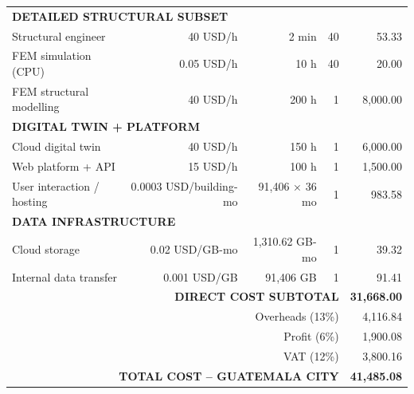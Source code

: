 \begin{longtable}{lrrrr}
\multicolumn{5}{l}{\textbf{DETAILED STRUCTURAL SUBSET}} \\

Structural engineer & 40 USD/h & 2 min & 40 & 53.33 \\
FEM simulation (CPU) & 0.05 USD/h & 10 h & 40 & 20.00 \\
FEM structural modelling & 40 USD/h & 200 h & 1 & 8,000.00 \\
\hline

\multicolumn{5}{l}{\textbf{DIGITAL TWIN + PLATFORM}} \\

Cloud digital twin & 40 USD/h & 150 h & 1 & 6,000.00 \\
Web platform + API & 15 USD/h & 100 h & 1 & 1,500.00 \\
User interaction / hosting & 0.0003 USD/building-mo & 91,406 × 36 mo & 1 & 983.58 \\
\hline

\multicolumn{5}{l}{\textbf{DATA INFRASTRUCTURE}} \\

Cloud storage & 0.02 USD/GB-mo & 1,310.62 GB-mo & 1 & 39.32 \\
Internal data transfer & 0.001 USD/GB & 91,406 GB & 1 & 91.41 \\
\hline

\multicolumn{4}{r}{\textbf{DIRECT COST SUBTOTAL}} & \textbf{31,668.00} \\
\hline

\multicolumn{4}{r}{Overheads (13\%)} & 4,116.84 \\
\multicolumn{4}{r}{Profit (6\%)} & 1,900.08 \\
\multicolumn{4}{r}{VAT (12\%)} & 3,800.16 \\
\hline

\multicolumn{4}{r}{\textbf{TOTAL COST – GUATEMALA CITY}} & \textbf{41,485.08} \\
\hline

\end{longtable}
















